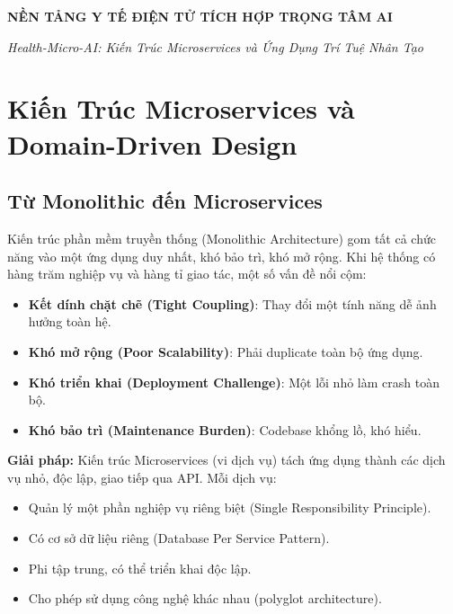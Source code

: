 \documentclass[12pt,a4paper]{article}
\begin{document}
{\Large \textbf{NỀN TẢNG Y TẾ ĐIỆN TỬ TÍCH HỢP TRỌNG TÂM AI}}

{\Large \textit{Health-Micro-AI: Kiến Trúc Microservices và Ứng Dụng Trí Tuệ Nhân Tạo}}

\vspace{2cm}
\tableofcontents
\newpage


\section{Kiến Trúc Microservices và Domain-Driven Design}

\subsection{Từ Monolithic đến Microservices}

Kiến trúc phần mềm truyền thống (Monolithic Architecture) gom tất cả chức năng vào một ứng dụng duy nhất, khó bảo trì, khó mở rộng. Khi hệ thống có hàng trăm nghiệp vụ và hàng tỉ giao tác, một số vấn đề nổi cộm:

\begin{itemize}
    \item \textbf{Kết dính chặt chẽ (Tight Coupling)}: Thay đổi một tính năng dễ ảnh hưởng toàn hệ.
    \item \textbf{Khó mở rộng (Poor Scalability)}: Phải duplicate toàn bộ ứng dụng.
    \item \textbf{Khó triển khai (Deployment Challenge)}: Một lỗi nhỏ làm crash toàn bộ.
    \item \textbf{Khó bảo trì (Maintenance Burden)}: Codebase khổng lồ, khó hiểu.
\end{itemize}

\textbf{Giải pháp:} Kiến trúc Microservices (vi dịch vụ) tách ứng dụng thành các dịch vụ nhỏ, độc lập, giao tiếp qua API. Mỗi dịch vụ:
\begin{itemize}
    \item Quản lý một phần nghiệp vụ riêng biệt (Single Responsibility Principle).
    \item Có cơ sở dữ liệu riêng (Database Per Service Pattern).
    \item Phi tập trung, có thể triển khai độc lập.
    \item Cho phép sử dụng công nghệ khác nhau (polyglot architecture).
\end{itemize}
\end{document}
